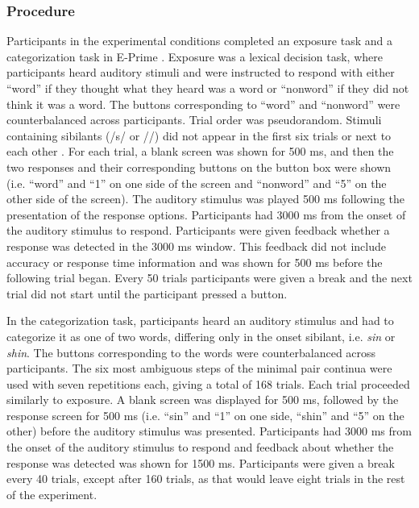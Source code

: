 \subsubsection{Procedure}

Participants in the experimental conditions completed an exposure task and a categorization task in E-Prime \citep{PsychologySoftwareTools2012}.  
Exposure was a lexical decision task, where participants heard auditory stimuli and were instructed to respond with either ``word'' if they thought what they heard was a word or ``nonword'' if they did not think it was a word.  
The buttons corresponding to ``word'' and ``nonword'' were counterbalanced across participants. 
Trial order was pseudorandom.
Stimuli containing sibilants (/s/ or /\textesh/) did not appear in the first six trials or next to each other \citep[following][]{Reinisch2013}.
For each trial, a blank screen was shown for 500 ms, and then the two responses and their corresponding buttons on the button box were shown (i.e. ``word'' and ``1'' on one side of the screen and ``nonword'' and ``5'' on the other side of the screen).
The auditory stimulus was played 500 ms following the presentation of the response options.
Participants had 3000 ms from the onset of the auditory stimulus to respond.
Participants were given feedback whether a response was detected in the 3000 ms window.
This feedback did not include accuracy or response time information and was shown for 500 ms  before the following trial began.
Every 50 trials participants were given a break and the next trial did not start until the participant pressed a button.

In the categorization task, participants heard an auditory stimulus and had to categorize it as one of two words, differing only in the onset sibilant, i.e. \emph{sin} or \emph{shin}.  
The buttons corresponding to the words were counterbalanced across participants.  
The six most ambiguous steps of the minimal pair continua were used with seven repetitions each, giving a total of 168 trials.
Each trial proceeded similarly to exposure.
A blank screen was displayed for 500 ms, followed by the response screen for 500 ms (i.e. ``sin'' and ``1'' on one side, ``shin'' and ``5'' on the other) before the auditory stimulus was presented.
Participants had 3000 ms from the onset of the auditory stimulus to respond and feedback about whether the response was detected was shown for 1500 ms.
Participants were given a break every 40 trials, except after 160 trials, as that would leave eight trials in the rest of the experiment.

